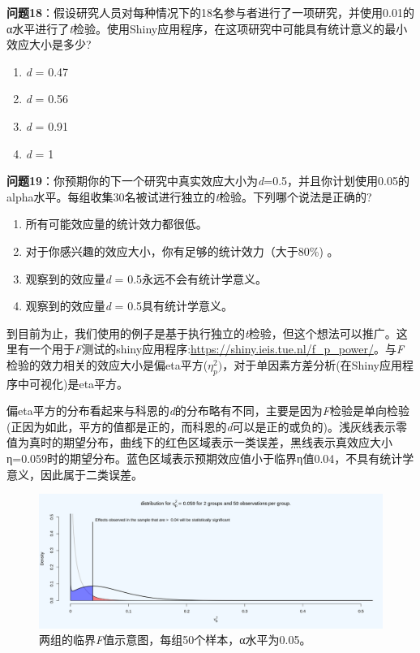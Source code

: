 \documentclass[
  letterpaper,
  DIV=11,
  numbers=noendperiod]{scrreprt}
\providecommand{\tightlist}{%
  \setlength{\itemsep}{0pt}\setlength{\parskip}{0pt}}\usepackage{longtable,booktabs,array}
\begin{document}
\textbf{问题18}：假设研究人员对每种情况下的18名参与者进行了一项研究，并使用0.01的α水平进行了\emph{t}检验。使用Shiny应用程序，在这项研究中可能具有统计意义的最小效应大小是多少?

\begin{enumerate}
\def\labelenumi{\Alph{enumi})}
\tightlist
\item
  \emph{d} = 0.47
\item
  \emph{d} = 0.56
\item
  \emph{d} = 0.91
\item
  \emph{d} = 1
\end{enumerate}

\textbf{问题19}：你预期你的下一个研究中真实效应大小为\emph{d}=0.5，并且你计划使用0.05的alpha水平。每组收集30名被试进行独立的\emph{t}检验。下列哪个说法是正确的?

\begin{enumerate}
\def\labelenumi{\Alph{enumi})}
\tightlist
\item
  所有可能效应量的统计效力都很低。
\item
  对于你感兴趣的效应大小，你有足够的统计效力（大于80\%) 。
\item
  观察到的效应量\emph{d} = 0.5永远不会有统计学意义。
\item
  观察到的效应量\emph{d} = 0.5具有统计学意义。
\end{enumerate}

到目前为止，我们使用的例子是基于执行独立的\emph{t}检验，但这个想法可以推广。这里有一个用于\emph{F}测试的shiny应用程序:\url{https://shiny.ieis.tue.nl/f_p_power/}。与\emph{F}检验的效力相关的效应大小是偏eta平方(\(\eta_{p}^{2})\)，对于单因素方差分析(在Shiny应用程序中可视化)是eta平方。

偏eta平方的分布看起来与科恩的\emph{d}的分布略有不同，主要是因为\emph{F}检验是单向检验(正因为如此，平方的值都是正的，而科恩的\emph{d}可以是正的或负的)。浅灰线表示零值为真时的期望分布，曲线下的红色区域表示一类误差，黑线表示真效应大小η=0.059时的期望分布。蓝色区域表示预期效应值小于临界η值0.04，不具有统计学意义，因此属于二类误差。

\begin{figure}

{\centering \includegraphics[width=1\textwidth,height=\textheight]{images/7f6d17dc07bdc9e95ea8944d78b16d7c.png}

}

\caption{\label{fig-critf}两组的临界\emph{F}值示意图，每组50个样本，α水平为0.05。}

\end{figure}
\end{document}
